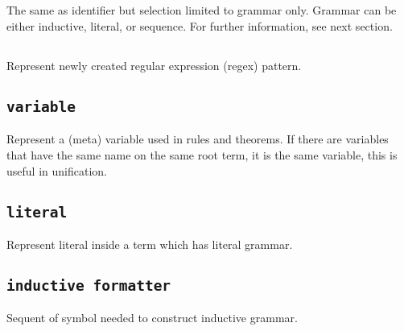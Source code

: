\documentclass[11pt, a4paper]{article}
\begin{document}
\subsection{} The same as identifier but selection limited to grammar only. Grammar can be either inductive, literal, or sequence. For further information, see next section. 

\newcommand{\pregex}[1]{
    \tcbox[on line, frame empty, colback = pregexColor!30!defaultColor, size = small]{
        \texttt{\textbf{\textcolor{pregexColor}{/#1/}}}
    }
}
\subsection{\pregex{regex}} Represent newly created regular expression (regex) pattern.

\newcommand{\pvar}[1]{
        \texttt{\textbf{\textcolor{pvarColor}{#1}}}
}
\subsection{\pvar{variable}} Represent a (meta) variable used in rules and theorems. If there are variables that have the same name on the same root term, it is the same variable, this is useful in unification.

\newcommand{\plit}[1]{
        \texttt{\textbf{\textcolor{plitColor}{#1}}}
}
\subsection{\plit{literal}} Represent literal inside a term which has literal grammar.

\newcommand{\pifmt}[1]{
        \boldmath\texttt{\textbf{\textcolor{pifmtColor}{#1}}}
}
\subsection{\pifmt{inductive formatter}} Sequent of symbol needed to construct inductive grammar.

\newcommand{\psfmt}[1]{
        \texttt{\textbf{\textcolor{psfmtColor}{#1}}}
}
\end{document}
